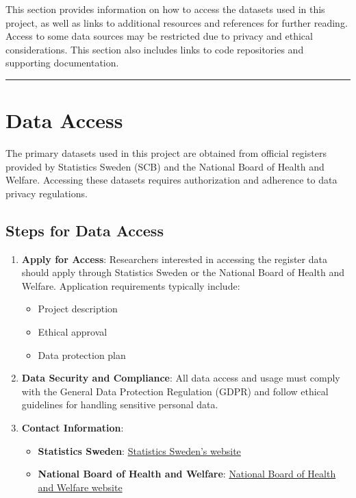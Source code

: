\documentclass[
]{book}
\providecommand{\tightlist}{%
  \setlength{\itemsep}{0pt}\setlength{\parskip}{0pt}}
\begin{document}
This section provides information on how to access the datasets used in this project, as well as links to additional resources and references for further reading. Access to some data sources may be restricted due to privacy and ethical considerations. This section also includes links to code repositories and supporting documentation.

\begin{center}\rule{0.5\linewidth}{0.5pt}\end{center}

\hypertarget{data-access}{%
\section{Data Access}\label{data-access}}

The primary datasets used in this project are obtained from official registers provided by Statistics Sweden (SCB) and the National Board of Health and Welfare. Accessing these datasets requires authorization and adherence to data privacy regulations.

\hypertarget{steps-for-data-access}{%
\subsection{Steps for Data Access}\label{steps-for-data-access}}

\begin{enumerate}
\def\labelenumi{\arabic{enumi}.}
\item
  \textbf{Apply for Access}: Researchers interested in accessing the register data should apply through Statistics Sweden or the National Board of Health and Welfare. Application requirements typically include:

  \begin{itemize}
  \tightlist
  \item
    Project description
  \item
    Ethical approval
  \item
    Data protection plan
  \end{itemize}
\item
  \textbf{Data Security and Compliance}: All data access and usage must comply with the General Data Protection Regulation (GDPR) and follow ethical guidelines for handling sensitive personal data.
\item
  \textbf{Contact Information}:

  \begin{itemize}
  \tightlist
  \item
    \textbf{Statistics Sweden}: \href{https://www.scb.se/}{Statistics Sweden's website}
  \item
    \textbf{National Board of Health and Welfare}: \href{https://www.socialstyrelsen.se/}{National Board of Health and Welfare website}
  \end{itemize}
\end{enumerate}
\end{document}
